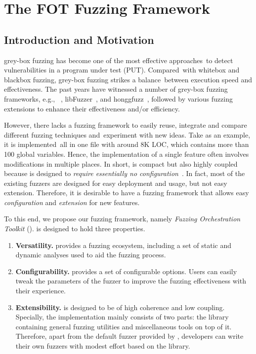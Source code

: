 
\chapter{The FOT Fuzzing Framework} \label{ch:fot}


\section{Introduction and Motivation}

grey-box fuzzing has become one of the most effective approaches~to detect vulnerabilities in a program under test (PUT).
Compared~with whitebox and blackbox fuzzing, grey-box fuzzing strikes a balance~between execution speed and effectiveness.
The past years have witnessed a number of grey-box fuzzing frameworks, e.g., {\AFL}~\cite{afl}, libFuzzer~\cite{libfuzzer}, and honggfuzz~\cite{honggfuzz}, followed by  various fuzzing extensions \cite{Bohme:2016:CGF,LiCMLLT17,Bohme:2017:DGF,CollAFL,nezha} to enhance their effectiveness and/or efficiency.


However, there lacks a fuzzing framework to easily reuse, integrate and compare different fuzzing techniques and~experiment with new ideas.
Take {\AFL} as an example, it is implemented~all in one file with around 8K LOC, which contains more than 100 global variables.
Hence, the implementation of a single feature often involves modifications in multiple places.
In short, {\AFL} is compact but also highly coupled because {\AFL} is designed to \textit{require essentially no configuration}~\cite{afl}.
In fact, most of the existing fuzzers are designed for easy deployment and usage, but not easy extension.
Therefore, it is desirable to have a fuzzing framework that allows easy \emph{configuration} and \emph{extension} for new features.


To this end, we propose our fuzzing framework, namely \emph{Fuzzing Orchestration Toolkit}  ({\FOT}). {\FOT} is designed to hold three properties.

\begin{enumerate}[(1)]


\item  \textbf{Versatility.}
{\FOT} provides a fuzzing ecosystem, including a set of static and dynamic analyses used to aid the fuzzing process.


\item \textbf{Configurability.}
{\FOT} provides a set of configurable options.
Users can easily tweak the parameters of the fuzzer to improve the fuzzing effectiveness with their experience.

\item \textbf{Extensibility.}
{\FOT} is designed to be of high coherence and low coupling. Specially, the implementation mainly consists of two parts: the library containing general fuzzing utilities and miscellaneous tools on top of it. Therefore, apart from the default fuzzer provided by {\FOT}, developers can write their own fuzzers with modest effort based on the library.
\end{enumerate}


